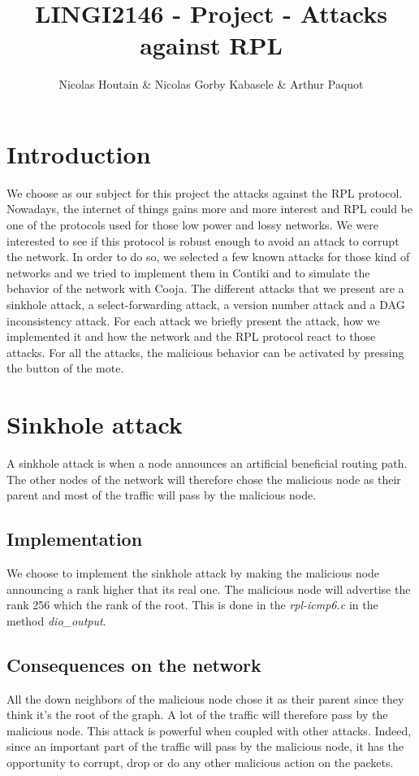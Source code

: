 \documentclass{report}
\title{LINGI2146 - Project - Attacks against RPL}
\author{Nicolas Houtain \& Nicolas Gorby Kabasele \& Arthur Paquot}
\begin{document}
\maketitle
\section{Introduction}
We choose as our subject for this project the attacks against the RPL protocol. Nowadays, the internet of things gains more and more interest and RPL could be one of the protocols used for those low power and lossy networks. We were interested to see if this protocol is robust enough to avoid an attack to corrupt the network. In order to do so, we selected a few known attacks for those kind of networks and we tried to implement them in Contiki and to simulate the behavior of the network with Cooja. The different attacks that we present are a sinkhole attack, a select-forwarding attack, a version number attack and a DAG inconsistency attack. For each attack we briefly present the attack, how we implemented it and how the network and the RPL protocol react to those attacks. For all the attacks, the malicious behavior can be activated by pressing the button of the mote.

\section{Sinkhole attack}
A sinkhole attack is when a node announces an artificial beneficial routing path. The other nodes of the network will therefore chose the malicious node as their parent and most of the traffic will pass by the malicious node.
\subsection*{Implementation}
We choose to implement the sinkhole attack by making the malicious node announcing a rank higher that its real one. The malicious node will advertise the rank 256 which the rank of the root. This is done in the \textit{rpl-icmp6.c} in the method \textit{dio\_output}.
\subsection*{Consequences on the network}
All the down neighbors of the malicious node chose it as their parent since they think it's the root of the graph. A lot of the traffic will therefore pass by the malicious node. This attack is powerful when coupled with other attacks. Indeed, since an important part of the traffic will pass by the malicious node, it has the opportunity to corrupt, drop or do any other malicious action on the packets.
\end{document}
